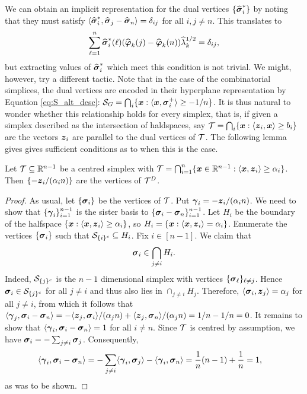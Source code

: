We can obtain an implicit representation for the dual vertices $\{\widehat{\vb*{\sigma}}^*_i\}$ by noting that they must satisfy  $\langle \widehat{\vb*{\sigma}}^*_i,\widehat{\vb*{\sigma}}_j-\widehat{\vb*{\sigma}}_n\rangle=\delta_{ij}$ for all $i,j\neq n$. This translates to 
\begin{equation*}
\sum_{\ell=1}^n \widehat{\vb*{\sigma}}^*_i(\ell)(\widehat{\vb*{\varphi}}_k(j)-\widehat{\vb*{\varphi}}_k(n))\widehat{\lambda}_k^{1/2}=\delta_{ij},
\end{equation*}
but extracting values of $\widehat{\vb*{\sigma}}^*_i$ which meet this condition is not trivial. 
We might, however, try a different tactic. Note that in the case of the combinatorial simplices, the dual vertices are encoded in their hyperplane representation by Equation \eqref{eq:S_alt_desc}: $\mathcal{S}_G = \bigcap_i\{\vb*{x}:\langle \vb*{x},\vb*{\sigma}_i^+\rangle \geq -1/n\}$. It is thus  natural to wonder whether this relationship holds for every simplex, that is,  if given a simplex described as the intersection of haldspaces, say $\mathcal{T}=\bigcap_i \{\vb*{x}:\langle \vb*{z}_i,\vb*{x}\rangle \geq b_i\}$ are the vectors $\vb*{z}_i$ are parallel to the dual vertices of $\mathcal{T}$.  The following lemma gives gives sufficient conditions as to when this is the case. 

 
\begin{lemma}
	\label{lem:hdesc_dual}
	Let $\mathcal{T}\subseteq\mathbb{R}^{n-1}$ be a centred simplex with $\mathcal{T}=\bigcap_{i=1}^n  \{\vb*{x}\in\mathbb{R}^{n-1}: \langle \vb*{x},\vb*{z}_i\rangle \geq  \alpha_i\}$. Then $\{-\vb*{z}_i/(\alpha_i n)\}$ are the vertices of $\mathcal{T}^D$. 
\end{lemma}
\begin{proof}
	As usual, let $\{\vb*{\sigma}_i\}$ be the vertices of $\mathcal{T}$. Put $\vb*{\gamma}_i = -\vb*{z}_i/(\alpha_i n)$. We need to show that $\{\vb*{\gamma}_i\}_{i=1}^{n-1}$ is the sister basis to $\{\vb*{\sigma}_i-\vb*{\sigma}_n\}_{i=1}^{n-1}$. Let $H_i$ be the boundary of the halfspace $\{\vb*{x}:\langle \vb*{x},\vb*{z}_i\rangle \geq \alpha_i\}$, so $H_i = \{\vb*{x}:\langle \vb*{x},\vb*{z}_i\rangle = \alpha_i\}$. Enumerate the vertices $\{\vb*{\sigma}_i\}$ such that $\mathcal{S}_{\{i\}^c} \subseteq H_i$. Fix $i\in[n-1]$. We claim that 
	\[\vb*{\sigma}_i \in \bigcap_{j\neq i}H_i.\]
	Indeed, $\mathcal{S}_{\{j\}^c}$ is the $n-1$ dimensional simplex with vertices $\{\vb*{\sigma}_\ell\}_{\ell\neq j}$. Hence $\vb*{\sigma}_i\in \mathcal{S}_{\{j\}^c}$ for all $j\neq i$ and thus also lies in $\cap_{j \neq i}H_j$. Therefore, $\langle \vb*{\sigma}_i,\vb*{z}_j\rangle = \alpha_j$ for all $j\neq i$, from which it follows  that $\langle \vb*{\gamma}_j,\vb*{\sigma}_i-\vb*{\sigma}_n\rangle = -\langle \vb*{z}_j,\vb*{\sigma}_i\rangle/(\alpha_j n) + \langle \vb*{z}_j,\vb*{\sigma}_n\rangle / (\alpha_j n )=1/n - 1/n =0$.  
	It remains to show that $\langle \vb*{\gamma}_i,\vb*{\sigma}_i-\vb*{\sigma}_n\rangle=1$ for all $i\neq n$. Since $\mathcal{T}$ is centred by assumption, we have $\vb*{\sigma}_i = -\sum_{j\neq i} \vb*{\sigma}_j$. Consequently, 
	\begin{align*}
	\langle \vb*{\gamma}_i,\vb*{\sigma}_i-\vb*{\sigma}_n\rangle &= -\sum_{j\neq i}\langle \vb*{\gamma}_i,\vb*{\sigma}_j\rangle - \langle \vb*{\gamma}_i,\vb*{\sigma}_n \rangle = \frac{1}{n}(n-1) + \frac{1}{n} = 1,
	\end{align*}
	as was to be shown.  
\end{proof}

